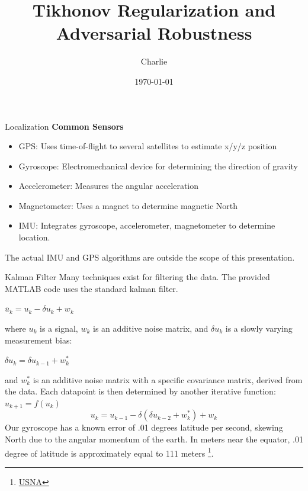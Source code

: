 \documentclass[10pt]{beamer}
\title{Tikhonov Regularization and Adversarial Robustness}
\author{Charlie}
\date{\today}
\theoremstyle{definition}
\let\olditem\item
\renewcommand{\item}{\setlength{\itemsep}{\fill}\olditem}
\begin{document}
\frame{\titlepage}

\begin{frame}{Localization}
\textbf{Common Sensors}
\begin{itemize}
    \item GPS: Uses time-of-flight to several satellites to estimate x/y/z position
    \item Gyroscope: Electromechanical device for determining the direction of gravity
    \item Accelerometer: Measures the angular acceleration
    \item Magnetometer: Uses a magnet to determine magnetic North
    \item IMU: Integrates gyroscope, accelerometer, magnetometer to determine location. 
\end{itemize}
The actual IMU and GPS algorithms are outside the scope of this presentation.
\end{frame}

\begin{frame}{Kalman Filter}
    Many techniques exist for filtering the data. The provided MATLAB code uses the standard kalman filter.
    
    $\bar{u}_k = u_k - \delta u_k + w_k$
    
    where $u_k$ is a signal, $w_k$ is an additive noise matrix, and $\delta u_k$ is a slowly varying measurement bias:
    
    $ \delta u_k = \delta u_{k-1} + w_k^*$

    and $w_k^*$ is an additive noise matrix with a specific covariance matrix, derived from the data. Each datapoint is then determined by another iterative function:
    $ u_{k+1} = f(u_k)$
    $$ u_k = u_{k-1} - \delta(\delta u_{k-2} + w_k^*) + w_k $$
    Our gyroscope has a known error of .01 degrees latitude per second, skewing North due to the angular momentum of the earth. In meters near the equator, .01 degree of latitude is approximately equal to 111 meters \footnote{\href{https://www.usna.edu/Users/oceano/pguth/md_help/html/approx_equivalents.htm}{USNA}}.  
\end{frame}

\end{document}
